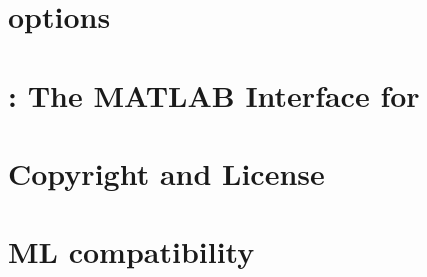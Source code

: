 \documentclass[pdf,12pt,report]{SANDreport}
\begin{document}
    \chapter{\muelu{} options} \label{sec:options}
    

    \chapter{\muemex: The MATLAB Interface for \muelu} \label{sec:muemex}
    


    \clearpage
    \providecommand*{\phantomsection}{}
    \phantomsection
    
    


    \appendix
    \chapter{Copyright and License}
    

    \chapter{ML compatibility}
    



    
\end{document}

